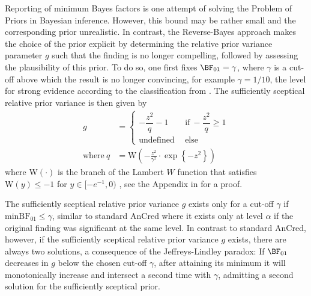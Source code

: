 Reporting of minimum Bayes factors is one attempt of solving the Problem of
Priors in Bayesian inference. However, this bound may be rather small and the
corresponding prior unrealistic. In contrast, the Reverse-Bayes approach makes
the choice of the prior explicit by determining the relative prior variance
parameter $g$ such that the finding is no longer compelling, followed by
assessing the plausibility of this prior. To do so, one first fixes
$\BF_{01} = \gamma$, where $\gamma$ is a cut-off above which the result is no
longer convincing, for example $\gamma = 1/10$, the level for strong evidence
according to the classification from \citet{Jeffreys1961}. The sufficiently
sceptical relative prior variance is then given by
\begin{align}
\label{ggamma}
  g &=
  \begin{cases}
    -\dfrac{z^2}{q} - 1
    & ~~ \text{if} ~
    -\dfrac{z^2}{q} \geq 1 \\
    \text{undefined} & ~~ \text{else}
  \end{cases} \\
  \text{where} ~ q &=
  \text{W} \left(-\frac{z^2}{\gamma^2} \cdot
  \exp\left\{-z^2\right\}\right)
  \nonumber
\end{align}
where $\text{W}(\cdot)$ is the branch of the Lambert $W$ function that satisfies
$\text{W}(y) \leq -1$ for \mbox{$y \in [-e^{-1}, 0)$} \citep{Corless1996}, see the
Appendix in \citep{Pawel2020b} for a proof.

The sufficiently sceptical relative prior variance $g$ exists only for a cut-off
$\gamma$ if $\text{minBF}_{01} \leq \gamma$, similar to standard AnCred where it
exists only at level $\alpha$ if the original finding was significant at the
same level. In contrast to standard AnCred, however, if the sufficiently
sceptical relative prior variance $g$ exists, there are always two solutions, a
consequence of the Jeffreys-Lindley paradox: If $\BF_{01}$ decreases in $g$
below the chosen cut-off $\gamma$, after attaining its minimum it will
monotonically increase and intersect a second time with $\gamma$, admitting a
second solution for the sufficiently sceptical prior.



